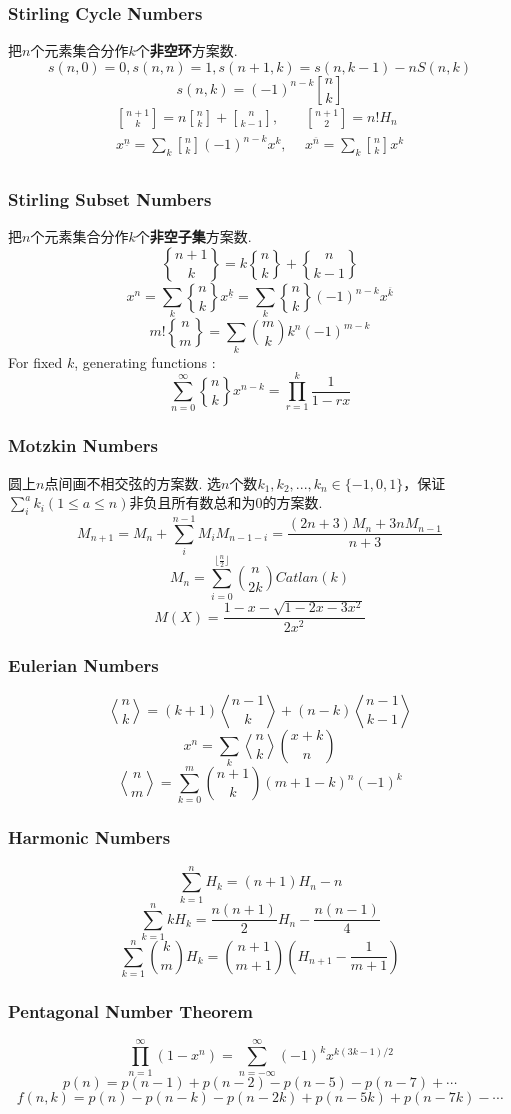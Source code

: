 \begin{small}
\subsubsection{Stirling Cycle Numbers}
把$n$个元素集合分作$k$个\textbf{非空环}方案数.
\[s(n,0)=0,s(n,n)=1,s(n+1,k)=s(n,k-1)-nS(n,k)\]
\[s(n,k)=(-1)^{n-k}{n \brack k}\]
\begin{align*}
 {n+1 \brack k} = n{n \brack k} + {n \brack k-1},&\ \  {n+1 \brack 2} = n!H_n \\
x^{\underline{n}} = \sum_k{ {n \brack k}(-1)^{n-k}x^k },&\ \  x^{\overline{n}} = \sum_k{ {n \brack k}x^k } \\
 \end{align*}
\subsubsection{Stirling Subset Numbers}
把$n$个元素集合分作$k$个\textbf{非空子集}方案数.
\[ {n+1 \brace k} = k{n \brace k} + {n \brace k-1} \]
\[ x^n = \sum_k{ {n \brace k}x^{\underline{k}} } = \sum_k{ {n \brace k}(-1)^{n-k}x^{\overline{k}} } \]
\[ m!{n \brace m} = \sum_k{m \choose k}k^n(-1)^{m-k} \]
For fixed $k$, generating functions :
\[\sum_{n=0}^{\infty}{n \brace k}x^{n-k}=\prod_{r=1}^{k}\frac{1}{1-rx}\]
\subsubsection{Motzkin Numbers}
圆上$n$点间画不相交弦的方案数. 选$n$个数$k_1,k_2,...,k_n\in\{-1,0,1\}$，保证$\sum_i^ak_i(1\leq a\leq n)$非负且所有数总和为$0$的方案数. \[M_{n+1}=M_n+\sum_i^{n-1}M_iM_{n-1-i}=\frac{(2n+3)M_n+3nM_{n-1}}{n+3}\]
\[M_n=\sum_{i=0}^{\lfloor \frac{n}{2}\rfloor}\binom{n}{2k}Catlan(k)\]
\[M(X)=\frac{1-x-\sqrt{1-2x-3x^2}}{2x^2}\]
\subsubsection{Eulerian Numbers}
\[ {n \bangle k} = (k+1){n-1 \bangle k} + (n-k){n-1 \bangle k-1} \]
\[ x^n = \sum_k{ {n \bangle k}{x+k \choose n} } \]
\[ {n \bangle m} = \sum_{k=0}^m{n+1 \choose k}(m+1-k)^n(-1)^k \]
\subsubsection{Harmonic Numbers}
\[ \sum_{k=1}^nH_k = (n+1)H_n-n \]
\[ \sum_{k=1}^nkH_k = \frac{n(n+1)}{2}H_n - \frac{n(n-1)}{4} \]
\[ \sum_{k=1}^n{k \choose m}H_k = {n+1 \choose m+1}(H_{n+1} - \frac{1}{m+1}) \]
\subsubsection{Pentagonal Number Theorem}
\[ \prod_{n=1}^{\infty}(1-x^n) = \sum_{n=-\infty}^{\infty}{(-1)^kx^{k(3k-1)/2}} \]
\[ p(n) = p(n-1)+p(n-2)-p(n-5)-p(n-7)+\cdots \]
\[ f(n, k) = p(n)-p(n-k)-p(n-2k)+p(n-5k)+p(n-7k)-\cdots \]

\end{small}
